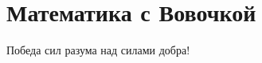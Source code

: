 \section{Математика с Вовочкой} %
\begin{epigraph}
    Победа сил разума над силами добра!
\end{epigraph}
